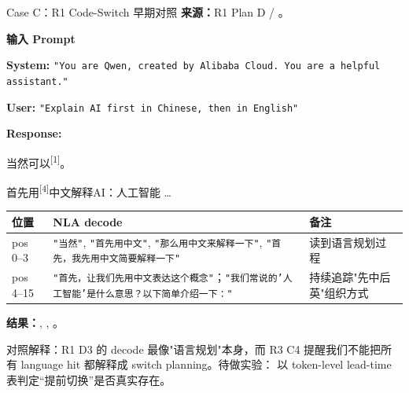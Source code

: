 \begin{frame}{Case C：R1 Code-Switch 早期对照}
\scriptsize
\textbf{来源：}R1 Plan D / 。

\textbf{输入 Prompt}

\textbf{System:} \texttt{"You are Qwen, created by Alibaba Cloud. You are a helpful assistant."}

\textbf{User:} \texttt{"Explain AI first in Chinese, then in English"}

\textbf{Response:}

当然\colorbox{green!15}{可以}\textsuperscript{[{1}]}。

首先\colorbox{green!15}{用}\textsuperscript{[{4}]}中文解释AI：人工智能 \dots

\begin{tabular}{lp{6.2cm}l}
\toprule
位置 & NLA decode & 备注 \\
\midrule
pos 0--3 & \texttt{"当然"}, \texttt{"首先用中文"}, \texttt{"那么用中文来解释一下"}, \texttt{"首先，我先用中文简要解释一下"} & 读到语言规划过程 \\
pos 4--15 & \texttt{"首先，让我们先用中文表达这个概念"}；\texttt{"我们常说的'人工智能'是什么意思？以下简单介绍一下："} & 持续追踪"先中后英"组织方式 \\
\bottomrule
\end{tabular}

\textbf{结果：}, , 。

\alert{对照解释：}R1 D3 的 decode 最像"语言规划"本身，而 R3 C4 提醒我们不能把所有 language hit 都解释成 switch planning。待做实验： 以 token-level lead-time 表判定“提前切换”是否真实存在。
\end{frame}
